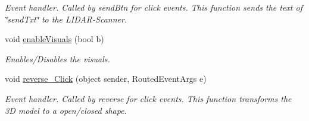 \begin{DoxyCompactItemize}
\begin{DoxyCompactList}\small\item\em Event handler. Called by send\+Btn for click events. This function sends the text of \char`\"{}send\+Txt\char`\"{} to the L\+I\+D\+A\+R-\/\+Scanner. \end{DoxyCompactList}\item 
void \hyperlink{class_l_i_d_a_r___controller_1_1_main_window_abc77995f990c7ef9dd53c0331b2c70a1}{enable\+Visuals} (bool b)
\begin{DoxyCompactList}\small\item\em Enables/\+Disables the visuals. \end{DoxyCompactList}\item 
void \hyperlink{class_l_i_d_a_r___controller_1_1_main_window_a644193ce9f107d5269d1443f8ff1d855}{reverse\+\_\+\+Click} (object sender, Routed\+Event\+Args e)
\begin{DoxyCompactList}\small\item\em Event handler. Called by reverse for click events. This function transforms the 3D model to a open/closed shape. \end{DoxyCompactList}\end{DoxyCompactItemize}
